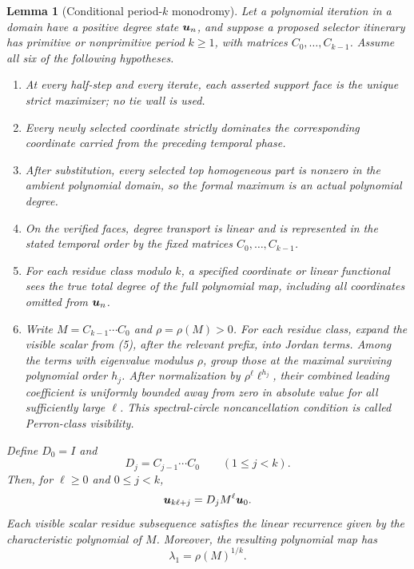 \documentclass[11pt]{article}
\newtheorem{lemma}[theorem]{Lemma}
\theoremstyle{definition}
\theoremstyle{remark}
\begin{document}
\begin{lemma}[Conditional period-\(k\) monodromy]
\label{lem:conditional-period-k}
Let a polynomial iteration in a domain have a positive degree state
\(\boldsymbol{u}_n\), and suppose a proposed selector itinerary has primitive or
nonprimitive period \(k\geq1\), with matrices
\(C_0,\ldots,C_{k-1}\).  Assume all six of the following hypotheses.
\begin{enumerate}[label=\textup{(\arabic*)},leftmargin=2.2em]
\item At every half-step and every iterate, each asserted support face is the
unique strict maximizer; no tie wall is used.
\item Every newly selected coordinate strictly dominates the corresponding
coordinate carried from the preceding temporal phase.
\item After substitution, every selected top homogeneous part is nonzero in
the ambient polynomial domain, so the formal maximum is an actual polynomial
degree.
\item On the verified faces, degree transport is linear and is represented
in the stated temporal order by the fixed matrices
\(C_0,\ldots,C_{k-1}\).
\item For each residue class modulo \(k\), a specified coordinate or linear
functional sees the true total degree of the full polynomial map, including
all coordinates omitted from \(\boldsymbol{u}_n\).
\item Write \(M=C_{k-1}\cdots C_0\) and \(\rho=\rho(M)>0\).  For each
residue class, expand the visible scalar from (5), after the relevant prefix,
into Jordan terms.  Among the terms with eigenvalue modulus \(\rho\), group
those at the maximal surviving polynomial order \(h_j\).  After normalization
by \(\rho^\ell\ell^{h_j}\), their combined leading coefficient is uniformly
bounded away from zero in absolute value for all sufficiently large \(\ell\).
This spectral-circle noncancellation condition is called Perron-class
visibility.
\end{enumerate}
Define \(D_0=I\) and
\[
D_j=C_{j-1}\cdots C_0\qquad(1\leq j<k).
\]
Then, for \(\ell\geq0\) and \(0\leq j<k\),
\begin{equation}
\boldsymbol{u}_{k\ell+j}=D_jM^\ell\boldsymbol{u}_0.
\label{eq:period-k-vector-law}
\end{equation}
Each visible scalar residue subsequence satisfies the linear recurrence
given by the characteristic polynomial of \(M\).  Moreover, the resulting
polynomial map has
\begin{equation}
\lambda_1=\rho(M)^{1/k}.
\label{eq:period-k-lambda}
\end{equation}
\end{lemma}
\end{document}
